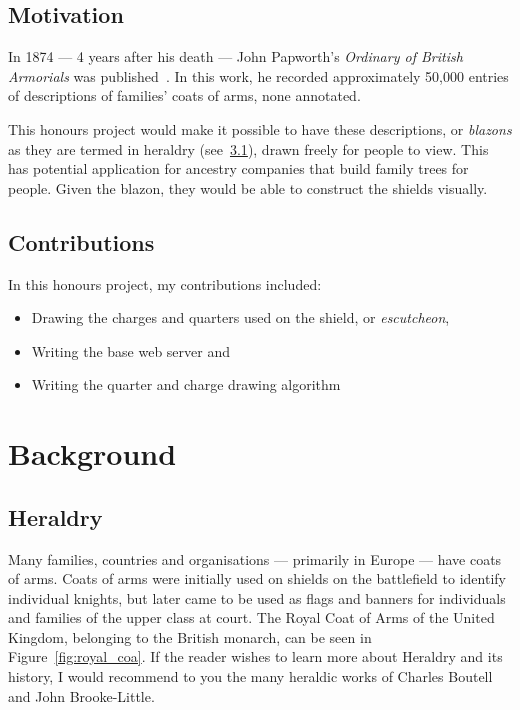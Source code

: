 \documentclass[nobib, a4paper, twoside, justified]{tufte-book}
\makeatletter
\newcommand{\charge}{\gls{charge}\@\xspace}
\newcommand{\charges}{\glspl{charge}\@\xspace}
\newcommand{\quarter}{\gls{quarter}\@\xspace}
\newcommand{\quarters}{\glspl{quarter}\@\xspace}
\newcommand{\blazon}{\gls{blazon}\@\xspace}
\newcommand{\blazons}{\glspl{blazon}\@\xspace}
\makeatother
\begin{document}
\section{Motivation}\label{sec:motivation}

In 1874 --- 4 years after his death --- John Papworth's \textit{Ordinary of British Armorials} was
published~\autocite{collins_1942}. In this work, he recorded approximately 50,000 entries of
descriptions of families' coats of arms, none annotated.

This honours project would make it possible to have these descriptions, or \textit{\blazons{}} as
they are termed in heraldry (see~\ref{sec:heraldry}), drawn freely for people to view. This has
potential application for ancestry companies that build family trees for people. Given the
\blazon{}, they would be able to construct the shields visually.

\section{Contributions}\label{sec:contributions}

In this honours project, my contributions included:

\begin{itemize}
  \item Drawing the \charges{} and \quarters{} used on the shield, or \textit{\gls{escutcheon}},
  \item Writing the base web server and
  \item Writing the \quarter{} and \charge{} drawing algorithm
\end{itemize}

\chapter{Background}\label{cha:background}

\section{Heraldry}\label{sec:heraldry}

Many families, countries and organisations --- primarily in Europe --- have coats of arms. Coats of
arms were initially used on shields on the battlefield to identify individual knights, but later
came to be used as flags and banners for individuals and families of the upper class at court. The
Royal Coat of Arms of the United Kingdom, belonging to the British monarch, can be seen in
Figure~\ref{fig:royal_coa}. If the reader wishes to learn more about Heraldry and its history, I
would recommend to you the many heraldic works of Charles Boutell and John Brooke-Little.
\end{document}

